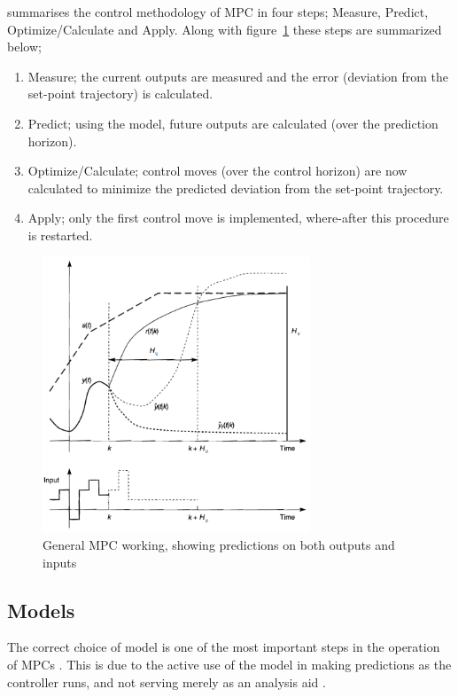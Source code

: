 \citet[8]{maciejowskimpc} summarises the control methodology of MPC in four steps; Measure, Predict, Optimize/Calculate and Apply. 
Along with figure~\ref{fig:mpc:general} these steps are summarized below;
\begin{enumerate}
  \item Measure; the current outputs are measured and the error (deviation from the set-point trajectory) is calculated.
  \item Predict; using the model, future outputs are calculated (over the prediction horizon).
  \item Optimize/Calculate; control moves (over the control horizon) are now calculated to minimize the predicted deviation from the set-point trajectory.
  \item Apply; only the first control move is implemented, where-after this procedure is restarted.
\end{enumerate}
\begin{figure}[htbp]
  \centering
  \includegraphics[width=8cm]{graph/mpc_general}
  \caption[General MPC working]{General MPC working, showing predictions on both outputs and inputs}
  \label{fig:mpc:general}
\end{figure}

\subsection{Models}
The correct choice of model is one of the most important steps in the operation of MPCs \citep[17]{rossiter}.
This is due to the active use of the model in making predictions as the controller runs, and not serving merely as an analysis aid \citep[37]{maciejowskimpc}.

